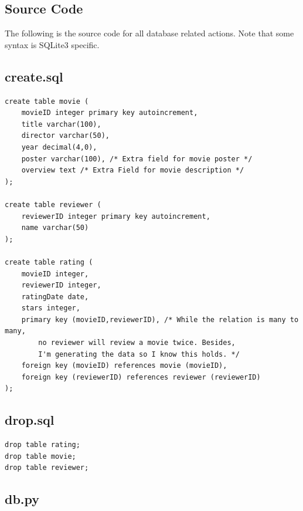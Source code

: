 \documentclass[10pt,a4paper]{scrreprt}
\begin{document}
\begin{appendices}
\chapter{Source Code}
The following is the source code for all database related actions. Note that some syntax is SQLite3 specific.

\section{create.sql}

\begin{verbatim}
create table movie (
    movieID integer primary key autoincrement,
    title varchar(100),
    director varchar(50),
    year decimal(4,0),
    poster varchar(100), /* Extra field for movie poster */
    overview text /* Extra Field for movie description */
);

create table reviewer (
    reviewerID integer primary key autoincrement,
    name varchar(50)
);

create table rating (
    movieID integer,
    reviewerID integer,
    ratingDate date,
    stars integer,
    primary key (movieID,reviewerID), /* While the relation is many to many,
        no reviewer will review a movie twice. Besides,
        I'm generating the data so I know this holds. */
    foreign key (movieID) references movie (movieID),
    foreign key (reviewerID) references reviewer (reviewerID)
);
\end{verbatim}

\section{drop.sql}

\begin{verbatim}
drop table rating;
drop table movie;
drop table reviewer;
\end{verbatim}

\section{db.py}
\begin{scriptsize}
\inputminted{python}{db.py}
\end{scriptsize}

\end{appendices}
\end{document}
